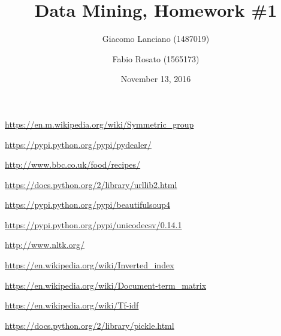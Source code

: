 \documentclass{article}
\title{Data Mining, Homework \#1}
\author{Giacomo Lanciano (1487019) \and Fabio Rosato (1565173)}
\date{November 13, 2016}
\begin{document}
\maketitle
\tableofcontents
{}

\newpage
{}


\newpage


\newpage


\newpage


\newpage
\begin{thebibliography}{9}
	
	\url{https://en.m.wikipedia.org/wiki/Symmetric_group}
	
	\url{https://pypi.python.org/pypi/pydealer/}
	
	\url{http://www.bbc.co.uk/food/recipes/}
	
	\url{https://docs.python.org/2/library/urllib2.html}
	
	\url{https://pypi.python.org/pypi/beautifulsoup4}
	
	\url{https://pypi.python.org/pypi/unicodecsv/0.14.1}
	
	\url{http://www.nltk.org/}
	
	\url{https://en.wikipedia.org/wiki/Inverted_index}
	
	\url{https://en.wikipedia.org/wiki/Document-term_matrix}
	
	\url{https://en.wikipedia.org/wiki/Tf-idf}
	
	\url{https://docs.python.org/2/library/pickle.html}
	
\end{thebibliography}
\end{document}

